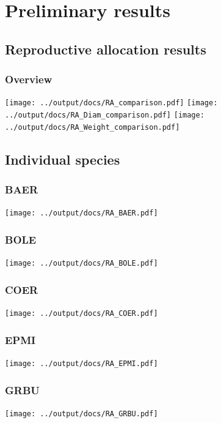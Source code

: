 \documentclass[10pt]{book} %
\begin{document}
\chapter{Preliminary results}
\section{Reproductive allocation results}
\subsection{Overview}
\texttt{[image: ../output/docs/RA\_comparison.pdf]}
\texttt{[image: ../output/docs/RA\_Diam\_comparison.pdf]}
\texttt{[image: ../output/docs/RA\_Weight\_comparison.pdf]}
\clearpage
\newpage
\section{Individual species}
\subsection{BAER}
\texttt{[image: ../output/docs/RA\_BAER.pdf]}

\clearpage
\newpage
\subsection{BOLE}
\texttt{[image: ../output/docs/RA\_BOLE.pdf]}

\clearpage
\newpage
\subsection{COER}
\texttt{[image: ../output/docs/RA\_COER.pdf]}

\clearpage
\newpage
\subsection{EPMI}
\texttt{[image: ../output/docs/RA\_EPMI.pdf]}

\clearpage
\newpage
\subsection{GRBU}
\texttt{[image: ../output/docs/RA\_GRBU.pdf]}
\end{document}
